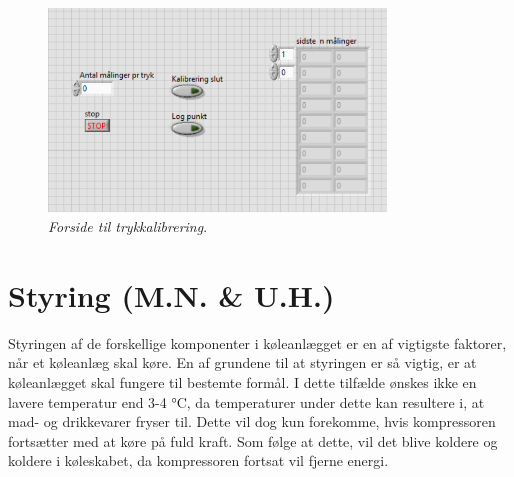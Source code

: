 \documentclass[../Hovedrapport.tex]{subfiles}
\begin{document}
\begin{figure}[H]
	\centering
	\includegraphics[width=0.80\textwidth]{Billeder/FCkali_tryk.png}
	\caption{\textit{Forside til trykkalibrering}.}
	\label{fig:FC_tryk}
\end{figure}
\section{Styring (M.N. \& U.H.)}
Styringen af de forskellige komponenter i køleanlægget er en af vigtigste faktorer, når et køleanlæg skal køre. En af grundene til at styringen er så vigtig, er at køleanlægget skal fungere til bestemte formål. I dette tilfælde ønskes ikke en lavere temperatur end 3-4 \si{\celsius}, da temperaturer under dette kan resultere i, at mad- og drikkevarer fryser til. Dette vil dog kun forekomme, hvis kompressoren fortsætter med at køre på fuld kraft. Som følge at dette, vil det blive koldere og koldere i køleskabet, da kompressoren fortsat vil fjerne energi. 
\end{document}
